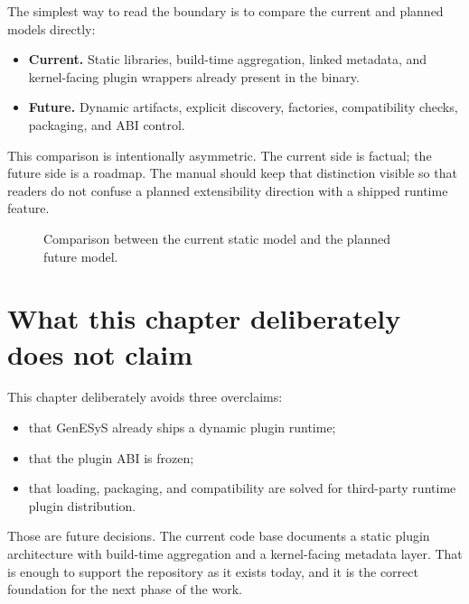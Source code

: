 The simplest way to read the boundary is to compare the current and planned
models directly:

\begin{itemize}
 \item \textbf{Current.} Static libraries, build-time aggregation, linked
   metadata, and kernel-facing plugin wrappers already present in the binary.
 \item \textbf{Future.} Dynamic artifacts, explicit discovery, factories,
   compatibility checks, packaging, and ABI control.
\end{itemize}

This comparison is intentionally asymmetric. The current side is factual; the
future side is a roadmap. The manual should keep that distinction visible so
that readers do not confuse a planned extensibility direction with a shipped
runtime feature.

\begin{figure}[htbp]
\caption{Comparison between the current static model and the planned future model.}
\label{fig:plugin-current-vs-future}
\end{figure}

\section{What this chapter deliberately does not claim}
\label{sec:plugin-does-not-claim}

This chapter deliberately avoids three overclaims:
\begin{itemize}
 \item that GenESyS already ships a dynamic plugin runtime;
 \item that the plugin ABI is frozen;
 \item that loading, packaging, and compatibility are solved for third-party
   runtime plugin distribution.
\end{itemize}

Those are future decisions. The current code base documents a static plugin
architecture with build-time aggregation and a kernel-facing metadata layer.
That is enough to support the repository as it exists today, and it is the
correct foundation for the next phase of the work.
